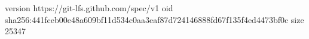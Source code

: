version https://git-lfs.github.com/spec/v1
oid sha256:441fceb00e48a609bf11d534c0aa3eaf87d724146888fd67f135f4ed4473bf0c
size 25347
